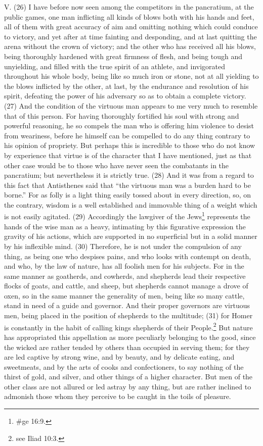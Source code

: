 V. (26) I have before now seen among the competitors in the pancratium, at the public games, one
man inflicting all kinds of blows both with his hands and feet, all of them with great accuracy of aim
and omitting nothing which could conduce to victory, and yet after at time fainting and desponding,
and at last quitting the arena without the crown of victory; and the other who has received all his
blows, being thoroughly hardened with great firmness of flesh, and being tough and unyielding, and
filled with the true spirit of an athlete, and invigorated throughout his whole body, being like so much
iron or stone, not at all yielding to the blows inflicted by the other, at last, by the endurance and
resolution of his spirit, defeating the power of his adversary so as to obtain a complete victory.
(27) And the condition of the virtuous man appears to me very much to resemble that of this
person. For having thoroughly fortified his soul with strong and powerful reasoning, he so compels
the man who is offering him violence to desist from weariness, before he himself can be compelled
to do any thing contrary to his opinion of propriety. But perhaps this is incredible to those who do
not know by experience that virtue is of the character that I have mentioned, just as that other case
would be to those who have never seen the combatants in the pancratium; but nevertheless it is
strictly true. (28) And it was from a regard to this fact that Antisthenes said that ``the virtuous man
was a burden hard to be borne.'' For as folly is a light thing easily tossed about in every direction,
so, on the contrary, wisdom is a well established and immovable thing of a weight which is not
easily agitated. (29) Accordingly the lawgiver of the Jews\footnote{\#ge 16:9.} represents the hands of
the wise man as a heavy, intimating by this figurative expression the gravity of his actions, which
are supported in no superficial but in a solid manner by his inflexible mind. (30) Therefore, he is not
under the compulsion of any thing, as being one who despises pains, and who looks with contempt
on death, and who, by the law of nature, has all foolish men for his subjects. For in the same
manner as goatherds, and cowherds, and shepherds lead their respective flocks of goats, and
cattle, and sheep, but shepherds cannot manage a drove of oxen, so in the same manner the
generality of men, being like so many cattle, stand in need of a guide and governor. And their
proper governors are virtuous men, being placed in the position of shepherds to the multitude; (31)
for Homer is constantly in the habit of calling kings shepherds of their People.\footnote{see Iliad 10:3.} But
nature has appropriated this appellation as more peculiarly belonging to the good, since the wicked
are rather tended by others than occupied in serving them; for they are led captive by strong wine,
and by beauty, and by delicate eating, and sweetmeats, and by the arts of cooks and
confectioners, to say nothing of the thirst of gold, and silver, and other things of a higher character.
But men of the other class are not allured or led astray by any thing, but are rather inclined to
admonish those whom they perceive to be caught in the toils of pleasure.

